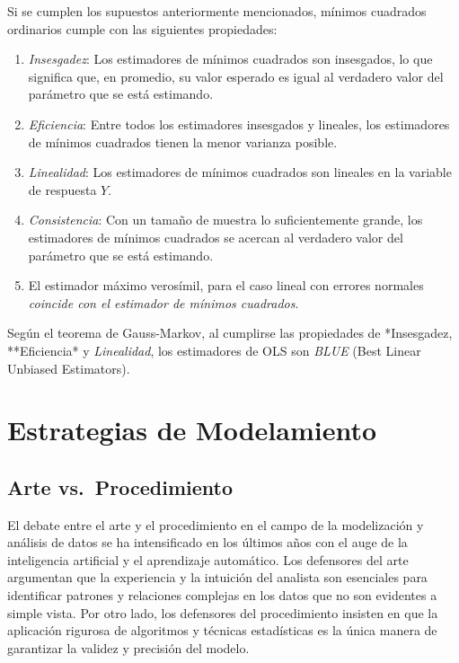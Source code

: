 \documentclass[
]{book}
\begin{document}
Si se cumplen los supuestos anteriormente mencionados, mínimos cuadrados
ordinarios cumple con las siguientes propiedades:

\begin{enumerate}
\def\labelenumi{\arabic{enumi}.}
\item
  \emph{Insesgadez}: Los estimadores de mínimos cuadrados son insesgados,
  lo que significa que, en promedio, su valor esperado es igual al
  verdadero valor del parámetro que se está estimando.
\item
  \emph{Eficiencia}: Entre todos los estimadores insesgados y lineales, los
  estimadores de mínimos cuadrados tienen la menor varianza posible.
\item
  \emph{Linealidad}: Los estimadores de mínimos cuadrados son lineales en
  la variable de respuesta \(Y\).
\item
  \emph{Consistencia}: Con un tamaño de muestra lo suficientemente grande,
  los estimadores de mínimos cuadrados se acercan al verdadero valor
  del parámetro que se está estimando.
\item
  El estimador máximo verosímil, para el caso lineal con errores
  normales \emph{coincide con el estimador de mínimos cuadrados}.
\end{enumerate}

Según el teorema de Gauss-Markov, al cumplirse las propiedades de
*Insesgadez, **Eficiencia* y \emph{Linealidad}, los estimadores de OLS
son \emph{BLUE} (Best Linear Unbiased Estimators).

\hypertarget{estrategias-de-modelamiento}{%
\section{Estrategias de Modelamiento}\label{estrategias-de-modelamiento}}

\hypertarget{arte-vs.-procedimiento}{%
\subsection{Arte vs.~Procedimiento}\label{arte-vs.-procedimiento}}

El debate entre el arte y el procedimiento en el campo de la
modelización y análisis de datos se ha intensificado en los últimos años
con el auge de la inteligencia artificial y el aprendizaje automático.
Los defensores del arte argumentan que la experiencia y la intuición del
analista son esenciales para identificar patrones y relaciones complejas
en los datos que no son evidentes a simple vista. Por otro lado, los
defensores del procedimiento insisten en que la aplicación rigurosa de
algoritmos y técnicas estadísticas es la única manera de garantizar la
validez y precisión del modelo.
\end{document}
